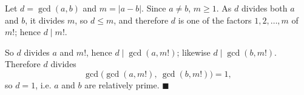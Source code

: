 Let $d=\gcd(a,b)$ and $m=|a-b|$. Since $a\ne b$, $m\ge1$. As $d$ divides both $a$ and $b$, it divides $m$, so $d\le m$, and therefore $d$ is one of the factors $1,2,\dots,m$ of $m!$; hence $d\mid m!$.

So $d$ divides $a$ and $m!$, hence $d\mid\gcd(a,m!)$; likewise $d\mid\gcd(b,m!)$. Therefore $d$ divides
\[\gcd\bigl(\gcd(a,m!),\ \gcd(b,m!)\bigr)=1,\]
so $d=1$, i.e. $a$ and $b$ are relatively prime. $\blacksquare$
